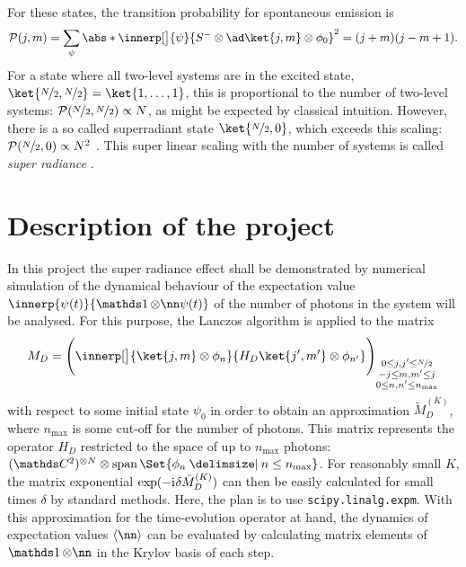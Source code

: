 For these states, the transition probability for spontaneous emission is \cite[Ch. 5]{larsonJaynesCummingsModelIts2021}
\begin{equation}
    \mathcal P(j,m) = \sum_{\psi} \abs*{\innerp[\big]{\psi}{\s-\otimes\ad \ket{j,m}\otimes  \phi_0}}^2
    = (j+m)(j-m+1)
    .
\end{equation}
For a state where all two-level systems are in the excited state, \(\ket{\nicefrac{N}{2}, \nicefrac{N}{2}} = \ket{1,\dots, 1}\), this is proportional to the number of two-level systems: \(\mathcal P(\nicefrac{N}{2}, \nicefrac{N}{2}) \propto N \), as might be expected by classical intuition.
However, there is a so called superradiant state \(\ket{\nicefrac{N}{2}, 0}\), which exceeds this scaling: \(\mathcal P(\nicefrac{N}{2}, 0) \propto N^2 \) \cite{larsonJaynesCummingsModelIts2021}.
This super linear scaling with the number of systems is called \emph{super radiance} \cite{dickeCoherenceSpontaneousRadiation1954}.

\section{Description of the project}
\label{ch:project-description}
In this project the super radiance effect shall be demonstrated by numerical simulation of the dynamical behaviour of the expectation value \(\innerp{\psi(t)}{\one\otimes\nn \psi(t)}\) of the number of photons in the system will be analysed.
For this purpose, the Lanczos algorithm is applied to the matrix 
\begin{equation}
    M_D = \of[\Bigg]{ \innerp[\big]{\ket{j,m}\otimes\phi_n}{H_D \ket{j\primed,m\primed}\otimes\phi_{n\primed}} }_{\substack{
        0\leq j,j\primed \leq \nicefrac{N}{2}
        \\
        -j \leq m,m\primed \leq j
        \\
        0 \leq n, n\primed \leq n_{\mathrm{max}}
    }}
\end{equation}
with respect to some initial state \(\psi_0\) in order to obtain an approximation \(\tilde M_D^{(K)}\), where \(n_{\mathrm{max}}\) is some cut-off for the number of photons.
This matrix represents the operator \(H_D\) restricted to the space of up to \(n_{\mathrm{max}}\) photons: \((\C^2)^{\otimes N} \otimes \vecspan\Set{\phi_n \given n\leq n_{\mathrm{max}}}\).
For reasonably small \(K\), the matrix exponential \(\exp(-\mathrm{i}\mkern1mu \delta \tilde M_D^{(K)})\) can then be easily calculated for small times \(\delta\) by standard methods.
Here, the plan is to use \texttt{scipy.linalg.expm}.
With this approximation for the time-evolution operator at hand, the dynamics of expectation values \(\langle \nn \rangle\) can be evaluated by calculating matrix elements of \(\one\otimes\nn\) in the Krylov basis of each step.

